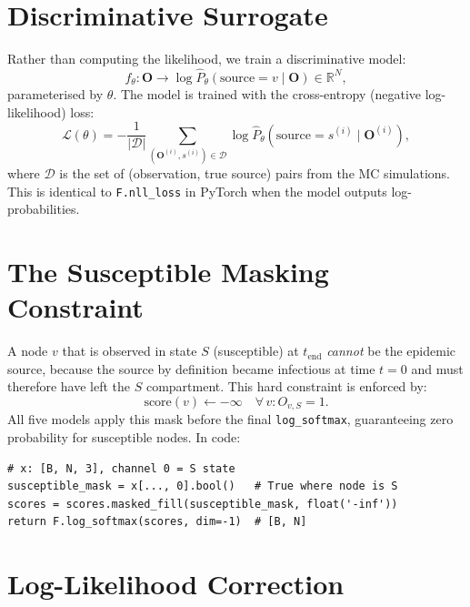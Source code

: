 \documentclass[12pt,a4paper]{report}
\newcommand{\R}{\mathbb{R}}
\newcommand{\calL}{\mathcal{L}}
\begin{document}
\section{Discriminative Surrogate}

Rather than computing the likelihood, we train a discriminative model:
\begin{equation}
  f_\theta : \mathbf{O} \longrightarrow \log \hat{P}_\theta(\text{source} = v \mid \mathbf{O}) \in \R^N,
\end{equation}
parameterised by $\theta$. The model is trained with the cross-entropy
(negative log-likelihood) loss:
\begin{equation}
  \calL(\theta) = -\frac{1}{|\mathcal{D}|} \sum_{(\mathbf{O}^{(i)}, s^{(i)}) \in \mathcal{D}} \log \hat{P}_\theta(\text{source} = s^{(i)} \mid \mathbf{O}^{(i)}),
  \label{eq:nll_loss}
\end{equation}
where $\mathcal{D}$ is the set of (observation, true source) pairs from the MC
simulations. This is identical to \texttt{F.nll\_loss} in PyTorch when the
model outputs log-probabilities.

\section{The Susceptible Masking Constraint}

A node $v$ that is observed in state $S$ (susceptible) at $t_{\text{end}}$
\emph{cannot} be the epidemic source, because the source by definition became
infectious at time $t=0$ and must therefore have left the $S$ compartment.
This hard constraint is enforced by:
\begin{equation}
  \text{score}(v) \leftarrow -\infty \quad \forall\, v : O_{v,S} = 1.
  \label{eq:susceptible_mask}
\end{equation}
All five models apply this mask before the final \texttt{log\_softmax},
guaranteeing zero probability for susceptible nodes. In code:
\begin{lstlisting}[caption={Susceptible masking (identical in all models).}]
# x: [B, N, 3], channel 0 = S state
susceptible_mask = x[..., 0].bool()   # True where node is S
scores = scores.masked_fill(susceptible_mask, float('-inf'))
return F.log_softmax(scores, dim=-1)  # [B, N]
\end{lstlisting}

\section{Log-Likelihood Correction}
\end{document}
